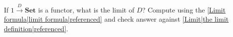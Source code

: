 
If $1 \xrightarrow{D}\mathbf{Set}$ is a functor, what is the limit of $D$? Compute using the \ref{Limit formula|limit formula|referenced} and check answer against \ref{Limit|the limit definition|referenced}.